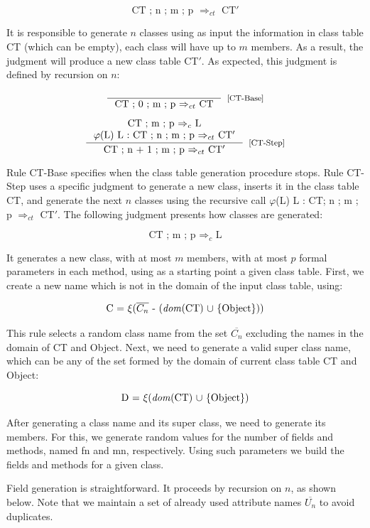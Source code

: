 \documentclass[tese,capa,english]{texufpel}
\begin{document}
\[
\textrm{CT ; n ; m ; p $\Rightarrow_{ct}$ CT$'$}
\]

It is responsible to generate $n$ classes using as input the information in class table CT (which can be empty), each class will have up to $m$ members. As a result, the judgment will produce a new class table CT$'$. As expected, this judgment is defined by recursion on $n$:

\[
\inference{}
          {\textrm{CT ; 0 ; m ; p $\Rightarrow_{ct}$ CT}}[\footnotesize{[CT-Base]}]
\]


\[
\inference{\textrm{CT ; m ; p $\Rightarrow_c$ L} \\
           \textrm{$\varphi$(L) L : CT ; n ; m ; p $\Rightarrow_{ct}$ CT$'$}}
          {\textrm{CT ; n + 1 ; m ; p $\Rightarrow_{ct}$ CT$'$}}[\footnotesize{[CT-Step]}]
\]         

Rule {\footnotesize CT-Base} specifies when the class table generation procedure stops. Rule {\footnotesize CT-Step} uses a specific judgment to generate a new class, inserts it in the class table CT, and generate the next $n$ classes using the recursive call $\varphi$(L) L : CT; n ; m ; p $\Rightarrow_{ct}$ CT$'$. The following judgment presents how classes are generated:

\[
\textrm{CT ; m ; p $\Rightarrow_c$ L}
\]

It generates a new class, with at most $m$ members, with at most $p$ formal parameters in each method, using as a starting point a given class table. First, we create a new name which is not in the domain of the input class table, using:

\[
\textrm{C = $\xi$($\overline{C_n}$ - (\emph{dom}(CT) $\cup$ \{Object\}))}
\]

This rule selects a random class name from the set $\overline{C_n}$ excluding the names in the domain of CT and Object. Next, we need to generate a valid super class name, which can be any of the set formed by the domain of current class table CT and Object:

\[
\textrm{D = $\xi$(\emph{dom}(CT) $\cup$ \{Object\})}
\]


After generating a class name and its super class, we need to generate its members. For this, we generate random values for the number of fields and methods, named fn and mn, respectively. Using such parameters we build the fields and methods for a given class. 

Field generation is straightforward. It proceeds by recursion on $n$, as shown below. Note that we maintain a set of already used attribute names $\overline{U_n}$ to avoid duplicates. 
\end{document}
